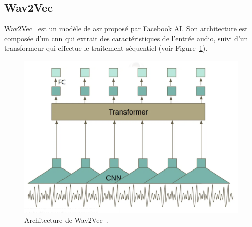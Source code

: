 \subsection{Wav2Vec}

Wav2Vec~\cite{Schneider_Baevski_Collobert_Auli_2019} est un modèle de \gls{asr} proposé par Facebook AI.
Son architecture est composée d'un \gls{cnn} qui extrait des caractéristiques de l'entrée audio,
suivi d'un transformeur qui effectue le traitement séquentiel (voir Figure~\ref{fig.wav2vec}).


\begin{figure}[hbt]
    \centering
    \includegraphics[width=.7\linewidth]{assets/images/wav2vec.png}
    \caption[Architecture de Wav2Vec.]{Architecture de Wav2Vec~\cite{Sus_2021}.}
    \label{fig.wav2vec}
\end{figure}